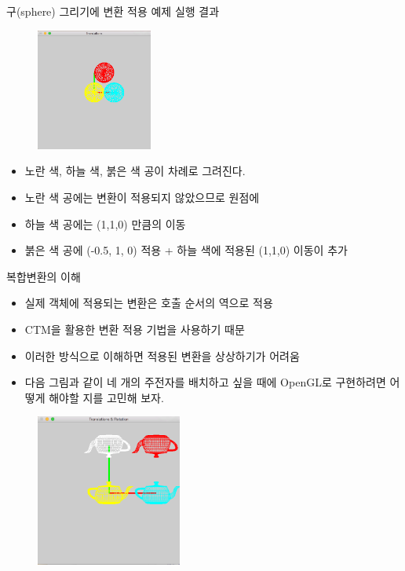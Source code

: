 \documentclass{beamer}
\begin{document}
\begin{frame}[fragile]{구(sphere) 그리기에 변환 적용 예제 실행 결과}

\begin{figure}
    \includegraphics[height=4cm]{OGL_transform/transformedBalls.png}
\end{figure}

{\small
\begin{block}{}
\begin{itemize}
\item 노란 색, 하늘 색, 붉은 색 공이 차례로 그려진다.  
\item 노란 색 공에는 변환이 적용되지 않았으므로 원점에
\item 하늘 색 공에는 (1,1,0) 만큼의 이동
\item 붉은 색 공에 (-0.5, 1, 0) 적용 + 하늘 색에 적용된 (1,1,0) 이동이 추가
\end{itemize}
\end{block}
}

\end{frame}


\begin{frame}[fragile]{복합변환의 이해}

\begin{itemize}
\item 실제 객체에 적용되는 변환은 호출 순서의 역으로 적용
\item CTM을 활용한 변환 적용 기법을 사용하기 때문
\item 이러한 방식으로 이해하면 적용된 변환을 상상하기가 어려움
\item 다음 그림과 같이 네 개의 주전자를 배치하고 싶을 때에 OpenGL로 구현하려면 어떻게 해야할 지를 고민해 보자.
\end{itemize}

\begin{figure}
    \includegraphics[height=5cm]{OGL_transform/fourTeapots.png}
\end{figure}


\end{frame}
\end{document}

